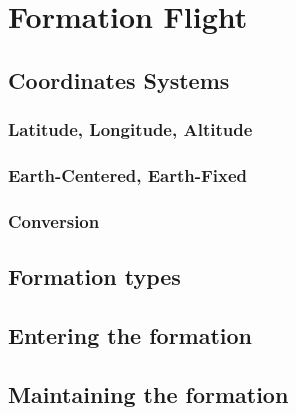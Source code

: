 \chapter{Formation Flight}
\label{chapter:formation-flight}

\section{Coordinates Systems}
\label{sec:coordinates-systems}

\subsection{Latitude, Longitude,  Altitude}
\label{sub-sec:lla}

\subsection{Earth-Centered, Earth-Fixed}
\label{sub-sec:ecef}

\subsection{Conversion}
\label{sub-sec:lla2ecef}

\section{Formation types}
\label{sec::formation-types}

\section{Entering the formation}
\label{sec:formation-entering}

\section{Maintaining the formation}
\label{sec:formation-maintainig}
